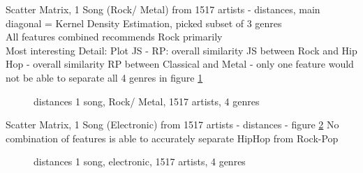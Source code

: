 \noindent Scatter Matrix, 1 Song (Rock/ Metal) from 1517 artists - distances, main diagonal = Kernel Density Estimation, picked subset of 3 genres\\ All features combined recommends Rock primarily\\
Most interesting Detail: Plot JS - RP: overall similarity JS between Rock and Hip Hop - overall similarity RP between Classical and Metal - only one feature would not be able to separate all 4 genres in figure \ref{fig:corr5}
\begin{figure}[htbp]
	\centering
	\caption{distances 1 song, Rock/ Metal, 1517 artists, 4 genres}
	\label{fig:corr5}
\end{figure}

\noindent Scatter Matrix, 1 Song (Electronic) from 1517 artists - distances - figure \ref{fig:corr6}
No combination of features is able to accurately separate HipHop from Rock-Pop
\begin{figure}[htbp]
	\centering
	\caption{distances 1 song, electronic, 1517 artists, 4 genres}
	\label{fig:corr6}
\end{figure}

